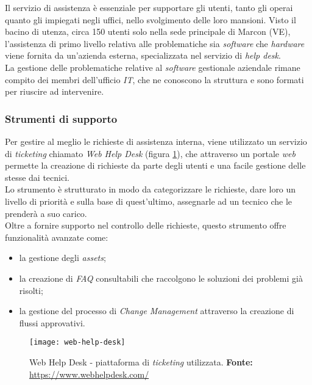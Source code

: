 Il servizio di assistenza è essenziale per supportare gli utenti, tanto gli operai quanto gli impiegati negli uffici, nello svolgimento delle loro mansioni. Visto il bacino di utenza, circa 150 utenti solo nella sede principale di Marcon (VE), l'assistenza di primo livello relativa alle problematiche sia \textit{software} che \textit{hardware} viene fornita da un'azienda esterna, specializzata nel servizio di \textit{help desk}.\\
La gestione delle problematiche relative al \textit{software} gestionale aziendale rimane compito dei membri dell'ufficio \textit{IT}, che ne conoscono la struttura e sono formati per riuscire ad intervenire. 


\subsubsection{Strumenti di supporto}

Per gestire al meglio le richieste di assistenza interna, viene utilizzato un servizio di \textit{ticketing} chiamato \textit{Web Help Desk} (figura \ref{fig:web-help-desk}), che attraverso un portale \textit{web} permette la creazione di richieste da parte degli utenti e una facile gestione delle stesse dai tecnici. \\
Lo strumento è strutturato in modo da categorizzare le richieste, dare loro un livello di priorità e sulla base di quest'ultimo, assegnarle ad un tecnico che le prenderà a suo carico.\\
Oltre a fornire supporto nel controllo delle richieste, questo strumento offre funzionalità avanzate come:
\begin{itemize}
	\item la gestione degli \textit{assets};
	\item la creazione di \textit{FAQ} consultabili che raccolgono le soluzioni dei problemi già risolti;
	\item la gestione del processo di \textit{Change Management} attraverso la creazione di flussi approvativi.
\end{itemize}

\vspace{10pt}
\begin{figure}[htbp]
	\begin{center}
		\texttt{[image: web-help-desk]}
		\caption{Web Help Desk - piattaforma di \textit{ticketing} utilizzata.\newline
		\textbf{Fonte: }\url{https://www.webhelpdesk.com/}}
	\label{fig:web-help-desk}
	\end{center}
\end{figure}

